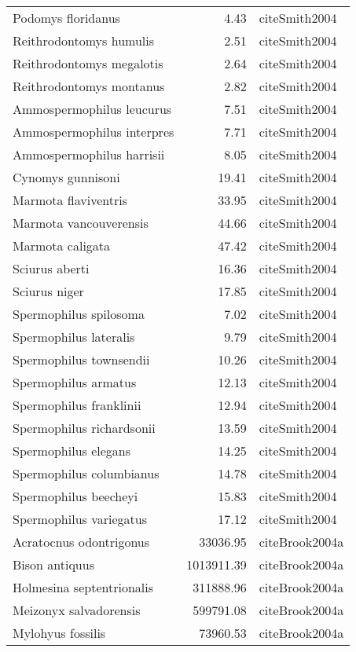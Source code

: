 \begin{table}[ht]
\begin{tabular}{lrl}
  Podomys floridanus & 4.43 & cite{Smith2004} \\ 
  Reithrodontomys humulis & 2.51 & cite{Smith2004} \\ 
  Reithrodontomys megalotis & 2.64 & cite{Smith2004} \\ 
  Reithrodontomys montanus & 2.82 & cite{Smith2004} \\ 
  Ammospermophilus leucurus & 7.51 & cite{Smith2004} \\ 
  Ammospermophilus interpres & 7.71 & cite{Smith2004} \\ 
  Ammospermophilus harrisii & 8.05 & cite{Smith2004} \\ 
  Cynomys gunnisoni & 19.41 & cite{Smith2004} \\ 
  Marmota flaviventris & 33.95 & cite{Smith2004} \\ 
  Marmota vancouverensis & 44.66 & cite{Smith2004} \\ 
  Marmota caligata & 47.42 & cite{Smith2004} \\ 
  Sciurus aberti & 16.36 & cite{Smith2004} \\ 
  Sciurus niger & 17.85 & cite{Smith2004} \\ 
  Spermophilus spilosoma & 7.02 & cite{Smith2004} \\ 
  Spermophilus lateralis & 9.79 & cite{Smith2004} \\ 
  Spermophilus townsendii & 10.26 & cite{Smith2004} \\ 
  Spermophilus armatus & 12.13 & cite{Smith2004} \\ 
  Spermophilus franklinii & 12.94 & cite{Smith2004} \\ 
  Spermophilus richardsonii & 13.59 & cite{Smith2004} \\ 
  Spermophilus elegans & 14.25 & cite{Smith2004} \\ 
  Spermophilus columbianus & 14.78 & cite{Smith2004} \\ 
  Spermophilus beecheyi & 15.83 & cite{Smith2004} \\ 
  Spermophilus variegatus & 17.12 & cite{Smith2004} \\ 
  Acratocnus odontrigonus & 33036.95 & cite{Brook2004a} \\ 
  Bison antiquus & 1013911.39 & cite{Brook2004a} \\ 
  Holmesina septentrionalis & 311888.96 & cite{Brook2004a} \\ 
  Meizonyx salvadorensis & 599791.08 & cite{Brook2004a} \\ 
  Mylohyus fossilis & 73960.53 & cite{Brook2004a} \\ 

\end{tabular}
\end{table}
